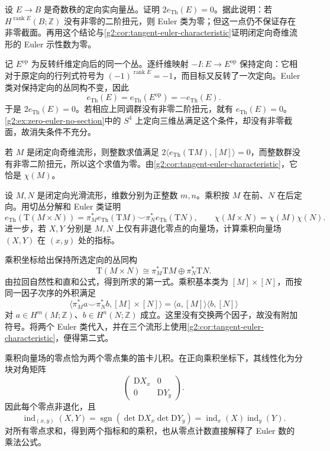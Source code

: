 \begin{exercise}\label{g2:ex:odd-rank-euler-torsion}
	设 \(E\to B\) 是奇数秩的定向实向量丛。证明 \(2e_{\mathrm{Th}}(E)=0\)。据此说明：若 \(H^{\operatorname{rank}E}(B;\mathbb Z)\) 没有非零的二阶扭元，则 Euler 类为零；但这一点仍不保证存在非零截面。再用这个结论与\cref{g2:cor:tangent-euler-characteristic}证明闭定向奇维流形的 Euler 示性数为零。
\end{exercise}
\begin{solution}
	记 \(E^{\mathrm{op}}\) 为反转纤维定向后的同一个丛。逐纤维映射 \(-I:E\to E^{\mathrm{op}}\) 保持定向：它相对于原定向的行列式符号为 \((-1)^{\operatorname{rank}E}=-1\)，而目标又反转了一次定向。Euler 类对保持定向的丛同构不变，因此
	\[
		e_{\mathrm{Th}}(E)=e_{\mathrm{Th}}(E^{\mathrm{op}})=-e_{\mathrm{Th}}(E).
	\]
	于是 \(2e_{\mathrm{Th}}(E)=0\)。若相应上同调群没有非零二阶扭元，就有 \(e_{\mathrm{Th}}(E)=0\)。\cref{g2:ex:zero-euler-no-section}中的 \(S^4\) 上定向三维丛满足这个条件，却没有非零截面，故消失条件不充分。

	若 \(M\) 是闭定向奇维流形，则整数求值满足 \(2\langle e_{\mathrm{Th}}(\mathrm TM),[M]\rangle=0\)，而整数群没有非零二阶扭元，所以这个求值为零。由\cref{g2:cor:tangent-euler-characteristic}，它恰是 \(\chi(M)\)。
\end{solution}

\begin{exercise}\label{g2:ex:product-tangent-euler}
	设 \(M,N\) 是闭定向光滑流形，维数分别为正整数 \(m,n\)。乘积按 \(M\) 在前、\(N\) 在后定向。用切丛分解和 Euler 类证明
	\[
		e_{\mathrm{Th}}(\mathrm T(M\times N))
		=\pi_M^*e_{\mathrm{Th}}(\mathrm TM)\smile\pi_N^*e_{\mathrm{Th}}(\mathrm TN),
		\qquad\chi(M\times N)=\chi(M)\chi(N).
	\]
	进一步，若 \(X,Y\) 分别是 \(M,N\) 上仅有非退化零点的向量场，计算乘积向量场 \((X,Y)\) 在 \((x,y)\) 处的指标。
\end{exercise}
\begin{solution}
	乘积坐标给出保持所选定向的丛同构
	\[
		\mathrm T(M\times N)\cong\pi_M^*\mathrm TM\oplus\pi_N^*\mathrm TN.
	\]
	由拉回自然性和直和公式，得到所求的第一式。乘积基本类为 \([M]\times[N]\)，而按同一因子次序的外积满足
	\[
		\bigl\langle\pi_M^*a\smile\pi_N^*b,[M]\times[N]\bigr\rangle
		=\langle a,[M]\rangle\langle b,[N]\rangle
	\]
	对 \(a\in H^m(M;\mathbb Z)\)、\(b\in H^n(N;\mathbb Z)\) 成立。这里没有交换两个因子，故没有附加符号。将两个 Euler 类代入，并在三个流形上使用\cref{g2:cor:tangent-euler-characteristic}，便得第二式。

	乘积向量场的零点恰为两个零点集的笛卡儿积。在正向乘积坐标下，其线性化为分块对角矩阵
	\[
		\begin{pmatrix}\mathrm DX_x&0\\0&\mathrm DY_y\end{pmatrix}.
	\]
	因此每个零点非退化，且
	\[
		\operatorname{ind}_{(x,y)}(X,Y)
		=\operatorname{sgn}(\det\mathrm DX_x\det\mathrm DY_y)
		=\operatorname{ind}_x(X)\operatorname{ind}_y(Y).
	\]
	对所有零点求和，得到两个指标和的乘积，也从零点计数直接解释了 Euler 数的乘法公式。
\end{solution}

